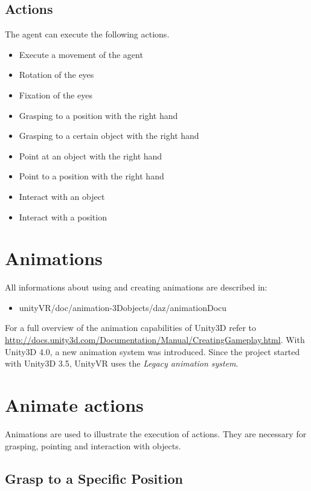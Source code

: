 \documentclass[10pt,final]{scrreprt}
\begin{document}
\subsection{Actions}
\label{actions}
The agent can execute the following actions.
\begin{itemize}
\item Execute a movement of the agent
\item Rotation of the eyes
\item Fixation of the eyes
\item Grasping to a position with the right hand
\item Grasping to a certain object with the right hand
\item Point at an object with the right hand
\item Point to a position with the right hand
\item Interact with an object
\item Interact with a position
\end{itemize}



\section{Animations}
All informations  about using and creating animations are described in:
\begin{itemize}
\item unityVR/doc/animation-3Dobjects/daz/animationDocu
\end{itemize}


For a full overview of the animation capabilities of Unity3D refer to \url{http://docs.unity3d.com/Documentation/Manual/CreatingGameplay.html}. With Unity3D 4.0, a new animation system was introduced. Since the project started with
Unity3D 3.5, UnityVR uses the \emph{Legacy animation system}.


\section{Animate actions}

Animations are used to illustrate the execution of actions. They are necessary for grasping, pointing and interaction with objects. 

\subsection{Grasp to a Specific Position}
\label{grasppos}
\end{document}
